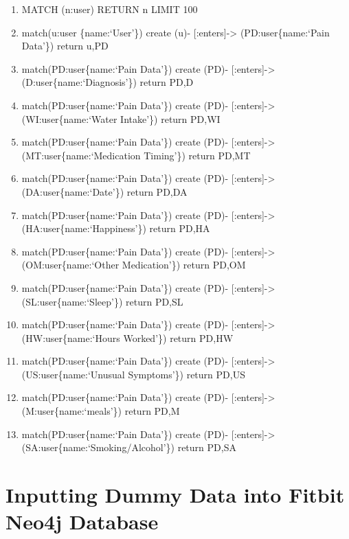\documentclass[]{book}
\providecommand{\tightlist}{%
  \setlength{\itemsep}{0pt}\setlength{\parskip}{0pt}}
\begin{document}
\begin{enumerate}
\def\labelenumi{\arabic{enumi}.}
\setcounter{enumi}{36}
\tightlist
\item
  MATCH (n:user) RETURN n LIMIT 100
\item
  match(u:user \{name:`User'\}) create (u)- {[}:enters{]}-\textgreater{} (PD:user\{name:`Pain Data'\}) return u,PD
\item
  match(PD:user\{name:`Pain Data'\}) create (PD)- {[}:enters{]}-\textgreater{} (D:user\{name:`Diagnosis'\}) return PD,D
\item
  match(PD:user\{name:`Pain Data'\}) create (PD)- {[}:enters{]}-\textgreater{} (WI:user\{name:`Water Intake'\}) return PD,WI
\item
  match(PD:user\{name:`Pain Data'\}) create (PD)- {[}:enters{]}-\textgreater{} (MT:user\{name:`Medication Timing'\}) return PD,MT
\item
  match(PD:user\{name:`Pain Data'\}) create (PD)- {[}:enters{]}-\textgreater{} (DA:user\{name:`Date'\}) return PD,DA
\item
  match(PD:user\{name:`Pain Data'\}) create (PD)- {[}:enters{]}-\textgreater{} (HA:user\{name:`Happiness'\}) return PD,HA
\item
  match(PD:user\{name:`Pain Data'\}) create (PD)- {[}:enters{]}-\textgreater{} (OM:user\{name:`Other Medication'\}) return PD,OM
\item
  match(PD:user\{name:`Pain Data'\}) create (PD)- {[}:enters{]}-\textgreater{} (SL:user\{name:`Sleep'\}) return PD,SL
\item
  match(PD:user\{name:`Pain Data'\}) create (PD)- {[}:enters{]}-\textgreater{} (HW:user\{name:`Hours Worked'\}) return PD,HW
\item
  match(PD:user\{name:`Pain Data'\}) create (PD)- {[}:enters{]}-\textgreater{} (US:user\{name:`Unusual Symptoms'\}) return PD,US
\item
  match(PD:user\{name:`Pain Data'\}) create (PD)- {[}:enters{]}-\textgreater{} (M:user\{name:`meals'\}) return PD,M
\item
  match(PD:user\{name:`Pain Data'\}) create (PD)- {[}:enters{]}-\textgreater{} (SA:user\{name:`Smoking/Alcohol'\}) return PD,SA
\end{enumerate}

\hypertarget{inputting-dummy-data-into-fitbit-neo4j-database}{%
\section{Inputting Dummy Data into Fitbit Neo4j Database}\label{inputting-dummy-data-into-fitbit-neo4j-database}}
\end{document}
